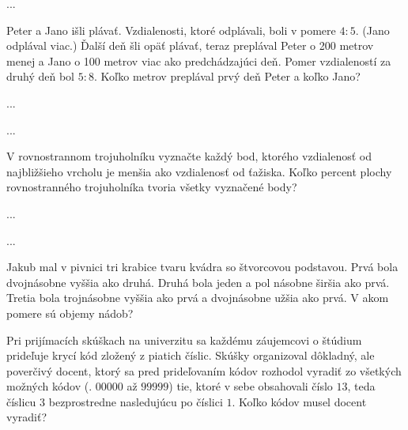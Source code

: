 {%
...}

{%
Peter a Jano išli plávať. Vzdialenosti, ktoré odplávali, boli v pomere $4:5$. (Jano odplával viac.)
Ďalší deň šli opäť plávať, teraz preplával Peter o 200 metrov menej a Jano o 100 metrov viac
ako predchádzajúci deň. Pomer vzdialeností za druhý deň bol $5:8$. Koľko metrov preplával prvý
deň Peter a koľko Jano?}

{%
...}

{%
...}

{%
V rovnostrannom trojuholníku vyznačte každý bod, ktorého vzdialenosť od najbližšieho
vrcholu je menšia ako vzdialenosť od ťažiska. Koľko percent plochy rovnostranného
trojuholníka tvoria všetky vyznačené body?}

{%
...}

{%
...}

{%
Jakub mal v pivnici tri krabice tvaru kvádra so štvorcovou podstavou. Prvá bola
dvojnásobne vyššia ako druhá. Druhá bola jeden a pol násobne širšia ako prvá. Tretia
bola trojnásobne vyššia ako prvá a dvojnásobne užšia ako prvá. V akom pomere sú
objemy nádob?}

{%
Pri prijímacích skúškach na univerzitu sa každému záujemcovi o štúdium prideľuje
krycí kód zložený z piatich číslic. Skúšky organizoval dôkladný, ale poverčivý docent,
ktorý sa pred prideľovaním kódov rozhodol vyradiť zo všetkých možných kódov (\tj.
$00000$ až $99999$) tie, ktoré v sebe obsahovali číslo $13$, teda číslicu $3$ bezprostredne
nasledujúcu po číslici $1$. Koľko kódov musel docent vyradiť?}

